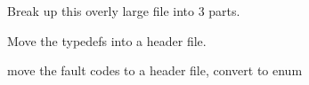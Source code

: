 
\begin{DoxyRefList}
\item[File \mbox{\hyperlink{main_8c}{main.c}} ]\label{todo__todo000001}%
%
Break up this overly large file into 3 parts. 

Move the typedefs into a header file. 
\item[Global \mbox{\hyperlink{main_8c_ac6a8c818f017b3526ecbcf9d4e79c755}{F\+A\+U\+L\+T\+\_\+\+N\+O\+NE}} ]\label{todo__todo000002}%
%
move the fault codes to a header file, convert to enum 
\end{DoxyRefList}